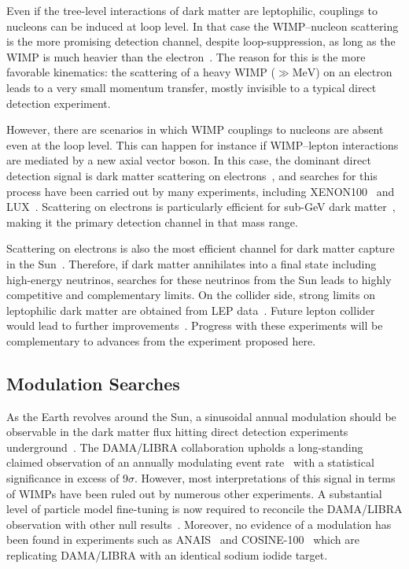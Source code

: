 Even if the tree-level interactions of dark matter are leptophilic, couplings to nucleons can be induced at loop level. In that case the WIMP--nucleon scattering is the more promising detection channel, despite loop-suppression, as long as the WIMP is much heavier than the electron~\cite{Kopp:2009et,Schmidt:2012yg,Kopp:2014tsa,Chang:2014tea,Bai:2014osa,Bell:2014tta,Kile:2014jea,Roberts:2016xfw,DEramo:2017zqw}. The reason for this is the more favorable kinematics: the scattering of a heavy WIMP ($\gg \mathrm{MeV}$) on an electron leads to a very small momentum transfer, mostly invisible to a typical direct detection experiment.

However, there are scenarios in which WIMP couplings to nucleons are absent even at the loop level. This can happen for instance if WIMP--lepton interactions are mediated by a new axial vector boson. In this case, the dominant direct detection signal is dark matter scattering on electrons~\cite{Kopp:2009et,Roberts:2015lga,Roberts:2016xfw}, and searches for this process have been carried out by many experiments, including XENON100~\cite{Aprile:2015ade,Aprile:2015ibr,Aprile:2017yea} and LUX~\cite{Akerib:2018zoq}. Scattering on electrons is particularly efficient for sub-GeV dark matter~\cite{Essig:2011nj}, making it the primary detection channel in that mass range. 

Scattering on electrons is also the most efficient channel for dark matter capture in the Sun~\cite{Kopp:2009et,Garani:2017jcj,Liang:2018cjn}. Therefore, if dark matter annihilates into a final state including high-energy neutrinos, searches for these neutrinos from the Sun leads to highly competitive and complementary limits. On the collider side, strong limits on leptophilic dark matter are obtained from LEP data~\cite{Fox:2011fx}. Future lepton collider would lead to further improvements~\cite{Dreiner:2012xm,Freitas:2014jla,Rawat:2017fak}. Progress with these experiments will be complementary to advances from the experiment proposed here.

\subsection{Modulation Searches}

As the Earth revolves around the Sun, a sinusoidal annual modulation should be observable in the dark matter flux hitting direct detection experiments underground~\cite{Drukier:1986tm,Freese:1987wu}. The DAMA/LIBRA collaboration upholds a long-standing claimed observation of an annually modulating event rate~\cite{Bernabei:2018yyw} with a statistical significance in excess of 9$\sigma$. However, most interpretations of this signal in terms of WIMPs have been ruled out by numerous other experiments. A substantial level of particle model fine-tuning is now required to reconcile the DAMA/LIBRA observation with other null results~\cite{Baum:2018ekm}. Moreover, no evidence of a modulation has been found in experiments such as ANAIS~\cite{Amare:2019jul,Amare:2021yyu} and COSINE-100~\cite{Adhikari:2019off,Adhikari:2021szr} which are replicating DAMA/LIBRA with an identical sodium iodide target.

